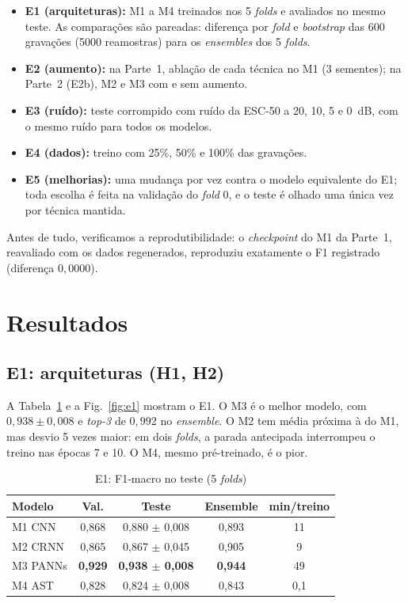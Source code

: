 \documentclass[conference]{IEEEtran}
\begin{document}
\begin{itemize}
  \item \textbf{E1 (arquiteturas):} M1 a M4 treinados nos 5 \textit{folds} e avaliados no mesmo teste. As comparações são pareadas: diferença por \textit{fold} e \textit{bootstrap} das 600 gravações (5000 reamostras) para os \textit{ensembles} dos 5 \textit{folds}.
  \item \textbf{E2 (aumento):} na Parte~1, ablação de cada técnica no M1 (3 sementes); na Parte~2 (E2b), M2 e M3 com e sem aumento.
  \item \textbf{E3 (ruído):} teste corrompido com ruído da ESC-50 a 20, 10, 5 e 0~dB, com o mesmo ruído para todos os modelos.
  \item \textbf{E4 (dados):} treino com 25\%, 50\% e 100\% das gravações.
  \item \textbf{E5 (melhorias):} uma mudança por vez contra o modelo equivalente do E1; toda escolha é feita na validação do \textit{fold} 0, e o teste é olhado uma única vez por técnica mantida.
\end{itemize}

Antes de tudo, verificamos a reprodutibilidade: o \textit{checkpoint} do M1 da Parte~1, reavaliado com os dados regenerados, reproduziu exatamente o F1 registrado (diferença $0{,}0000$).

\section{Resultados}

\subsection{E1: arquiteturas (H1, H2)}

A Tabela~\ref{tab:e1} e a Fig.~\ref{fig:e1} mostram o E1. O M3 é o melhor modelo, com $0{,}938 \pm 0{,}008$ e \textit{top-3} de $0{,}992$ no \textit{ensemble}. O M2 tem média próxima à do M1, mas desvio 5 vezes maior: em dois \textit{folds}, a parada antecipada interrompeu o treino nas épocas 7 e 10. O M4, mesmo pré-treinado, é o pior.

\begin{table}[htbp]
\caption{E1: F1-macro no teste (5 \textit{folds})}
\label{tab:e1}
\centering
\footnotesize
\begin{tabular}{@{}lcccc@{}}
\toprule
\textbf{Modelo} & \textbf{Val.} & \textbf{Teste} & \textbf{Ensemble} & \textbf{min/treino} \\
\midrule
M1 CNN & 0,868 & 0,880 $\pm$ 0,008 & 0,893 & 11 \\
M2 CRNN & 0,865 & 0,867 $\pm$ 0,045 & 0,905 & 9 \\
M3 PANNs & \textbf{0,929} & \textbf{0,938 $\pm$ 0,008} & \textbf{0,944} & 49 \\
M4 AST & 0,828 & 0,824 $\pm$ 0,008 & 0,843 & 0,1 \\
\bottomrule
\end{tabular}
\end{table}
\end{document}
